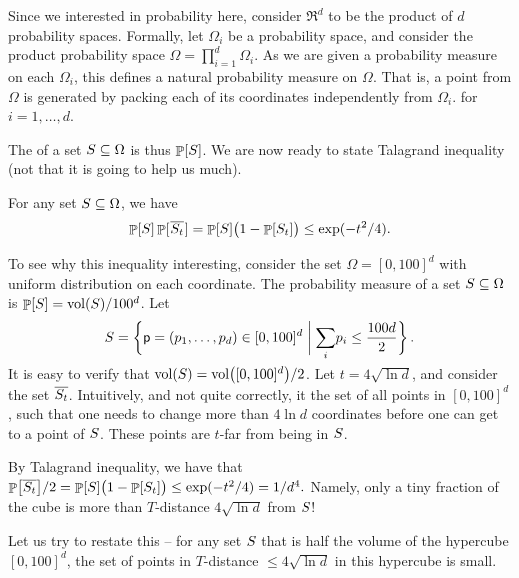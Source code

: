 Since we interested in probability here, consider $\Re^d$ to be the
product of $d$ probability spaces. Formally, let $\Omega_i$ be a
probability space, and consider the product probability space
$\Omega = \prod_{i=1}^d \Omega_i$. As we are given a probability
measure on each $\Omega_i$, this defines a natural probability measure
on $\Omega$. That is, a point from $\Omega$ is generated by packing
each of its coordinates independently from $\Omega_i$. for
$i=1,\ldots, d$.

The  of a set $S \subseteq \Omega$ is thus
$\Prob{\SetA}$. We are now ready to state Talagrand inequality (not
that it is going to help us much).

\newcommand{\TalagrandBody}{%
    X }%

\begin{theorem}
    For any set $S \subseteq \Omega$, we have
    \begin{equation*}
        \Prob{\SetA}\Prob{ \ts \smash{\overline{\SetA_t}}\ts }%
        =%
        \Prob{\SetA}\pth{\bigl. 1 - \Prob{ \SetA_t} } \leq %
        \exp( -t^2 /4).
    \end{equation*}%
\end{theorem}

\begin{example}
    To see why this inequality interesting, consider the set
    $\Omega = [0,100]^d$ with uniform distribution on each
    coordinate. The probability measure of a set $S \subseteq \Omega$ is
    $\Prob{\SetA} = \volX{\SetA} / 100^d$. Let
    \begin{equation*}
        \SetA = \Set{ \pnt =(\pntCoord_1, \ldots, \pntCoord_d) \in
           [0,100]^d}%
        {\smash{\sum_i} \Bigl. \pntCoord_i \leq \frac{100d}{2}}.
    \end{equation*}
    It is easy to verify that $\volX{\SetA} = \volX{[0,100]^d}/2$.
    Let $t= 4\sqrt{\ln d}$, and consider the set
    $\overline{S_t}$. Intuitively, and not quite correctly, it the
    set of all points in $[0,100]^d$, such that one needs to change
    more than $4 \ln d$ coordinates before one can get to a point of
    $S$. These points are $t$-far from being in $S$.

    By Talagrand inequality, we have that 
    \begin{math}
        {\Prob{\overline{\SetA_t}}}/{2}%
        =%
        \Prob{\SetA}\pth{\bigl. 1 - \Prob{ \SetA_t} }%
        \leq %
        \exp( -t^2 /4)%
        =%
        1/d^4.
    \end{math}
    Namely, only a tiny fraction of the cube is more than $T$-distance
    $4 \sqrt{\ln d}$ from $S$!

    Let us try to restate this -- for any set $S$ that is half the
    volume of the hypercube $[0,100]^d$, the set of points in
    $T$-distance $\leq 4 \sqrt{\ln d}$ in this hypercube is small.
\end{example}


